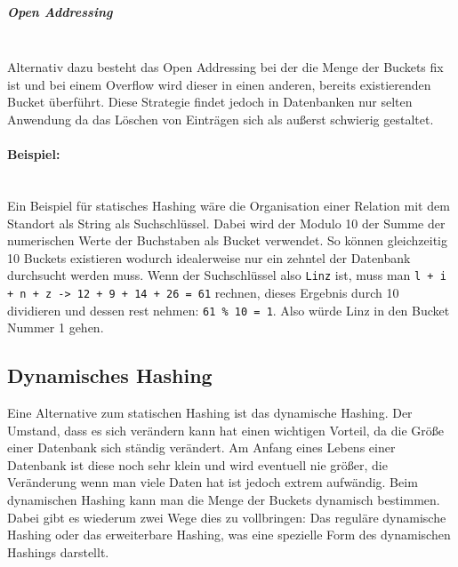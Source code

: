 \documentclass{article}
\newcommand{\paragraphlb}[1]{\paragraph{#1}\mbox{}\\}
\newcommand{\subparagraphlb}[1]{\subparagraph{#1}\mbox{}\\}
\begin{document}
	\subparagraphlb{Open Addressing}
	Alternativ dazu besteht das Open Addressing bei der die Menge der Buckets fix ist und bei einem Overflow wird dieser in einen anderen, bereits existierenden Bucket überführt. Diese Strategie findet jedoch in Datenbanken nur selten Anwendung da das Löschen von Einträgen sich als außerst schwierig gestaltet.
	\paragraphlb{Beispiel:}
	Ein Beispiel für statisches Hashing wäre die Organisation einer Relation mit dem Standort als String als Suchschlüssel. Dabei wird der Modulo 10 der Summe der numerischen Werte der Buchstaben als Bucket verwendet. So können gleichzeitig 10 Buckets existieren wodurch idealerweise nur ein zehntel der Datenbank durchsucht werden muss. Wenn der Suchschlüssel also \texttt{Linz} ist, muss man \texttt{l + i + n + z -> 12 + 9 + 14 + 26 = 61} rechnen, dieses Ergebnis durch 10 dividieren und dessen rest nehmen: \texttt{61 \% 10 = 1}. Also würde Linz in den Bucket Nummer 1 gehen.
	\subsection{Dynamisches Hashing}
	Eine Alternative zum statischen Hashing ist das dynamische Hashing. Der Umstand, dass es sich verändern kann hat einen wichtigen Vorteil, da die Größe einer Datenbank sich ständig verändert. Am Anfang eines Lebens einer Datenbank ist diese noch sehr klein und wird eventuell nie größer, die Veränderung wenn man viele Daten hat ist jedoch extrem aufwändig. Beim dynamischen Hashing kann man die Menge der Buckets dynamisch bestimmen. Dabei gibt es wiederum zwei Wege dies zu vollbringen: Das reguläre dynamische Hashing oder das erweiterbare Hashing, was eine spezielle Form des dynamischen Hashings darstellt.
\end{document}
